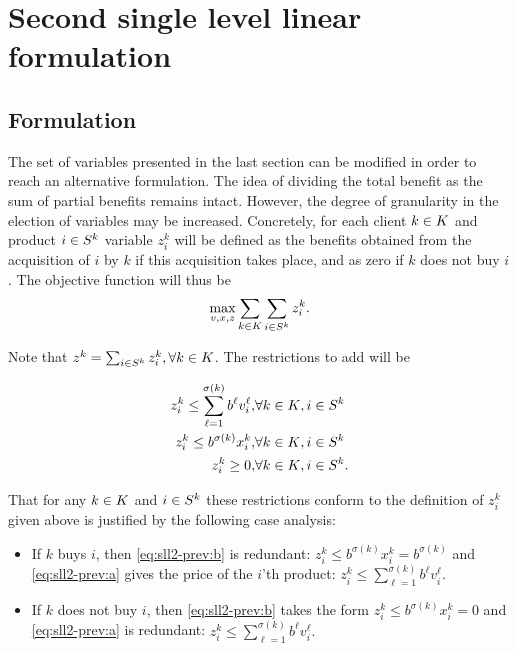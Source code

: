 \section{Second single level linear formulation} %
\label{sec:las:sll2}

\subsection{Formulation} %
\label{ssc:las:sll2:formulation}

The set of variables presented in the last section can be modified in order to
reach an alternative formulation. The idea of dividing the total benefit as the
sum of partial benefits remains intact. However, the degree of granularity in
the election of variables may be increased. Concretely, for each client ${k \in K}$
and product ${i \in S^k}$ variable $z_i^k$ will be defined as the benefits obtained from
the acquisition of $i$ by $k$ if this acquisition takes place, and as zero if
$k$ does not buy $i$. The objective function will thus be
\[
    \max_{v,x,z} \sum_{k \in K} \sum_{i \in S^k} z_i^k.
\]

\noindent
Note that
$
    z^k = \sum_{i \in S^k} z_i^k, \forall{\ensuremath{k \in K}}
$.
The restrictions to add will be
{
    \newcommand{\suml}    {\sum_{\ell=1}^{\sigma(k)}}

    \begin{eqnarray}
        z_i^k\leq \suml b^\ell v_i^\ell,&\forall\kk,\is \label{eq:sll2-prev:a}\\
        z_i^k\leq b^{\sigma(k)} x_i^k,  &\forall\kk,\is \label{eq:sll2-prev:b}\\
        z_i^k\geq 0,                    &\forall\kk,\is.\label{eq:sll2-prev:c}
    \end{eqnarray}
}

That for any ${k \in K}$ and ${i \in S^k}$ these restrictions conform to the definition of
$z_i^k$ given above is justified by the following case analysis:
\begin{itemize}
    
    \item %
        If $k$ buys $i$, then \eqref{eq:sll2-prev:b} is redundant:
        $
            z_i^k \leq b^{\sigma(k)}x_i^k = b^{\sigma(k)}
        $
	and \eqref{eq:sll2-prev:a} gives the price of the $i$'th product:
        {
            \newcommand{\suml}    {\sum_{\ell=1}^{\sigma(k)}}
            $
                z_i^k \leq \suml b^\ell v_i^\ell.
            $
        }
    \item %
	If $k$ does not buy $i$, then \eqref{eq:sll2-prev:b} takes the form
        $
            z_i^k \leq b^{\sigma(k)}x_i^k = 0
        $
        and \eqref{eq:sll2-prev:a} is redundant:
        {
            \newcommand{\suml}    {\sum_{\ell=1}^{\sigma(k)}}
            $
                z_i^k \leq \suml b^\ell v_i^\ell.
            $
        }
    
\end{itemize}

